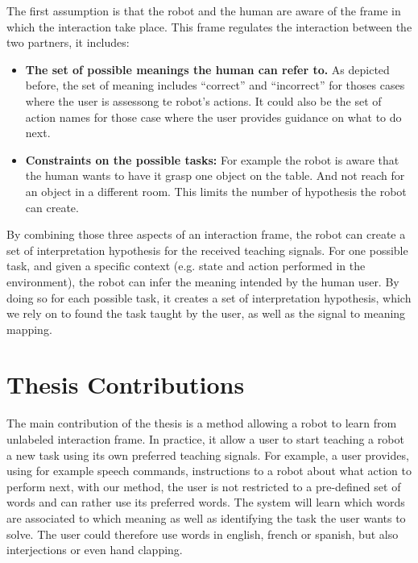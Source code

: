 The first assumption is that the robot and the human are aware of the frame in which the interaction take place. This frame regulates the interaction between the two partners, it includes:

\begin{itemize}

\item \textbf{The set of possible meanings the human can refer to.} As depicted before, the set of meaning includes ``correct'' and ``incorrect'' for thoses cases where the user is assessong te robot's actions. It could also be the set of action names for those case where the user provides guidance on what to do next.

\item \textbf{Constraints on the possible tasks:} For example the robot is aware that the human wants to have it grasp one object on the table. And not reach for an object in a different room. This limits the number of hypothesis the robot can create.

\end{itemize}

By combining those three aspects of an interaction frame, the robot can create a set of interpretation hypothesis for the received teaching signals. For one possible task, and given a specific context (e.g. state and action performed in the environment), the robot can infer the meaning intended by the human user. By doing so for each possible task, it creates a set of interpretation hypothesis, which we rely on to found the task taught by the user, as well as the signal to meaning mapping.

\section{Thesis Contributions}

The main contribution of the thesis is a method allowing a robot to learn from unlabeled interaction frame. In practice, it allow a user to start teaching a robot a new task using its own preferred teaching signals. For example, a user provides, using for example speech commands, instructions to a robot about what action to perform next, with our method, the user is not restricted to a pre-defined set of words and can rather use its preferred words. The system will learn which words are associated to which meaning as well as identifying the task the user wants to solve. The user could therefore use words in english, french or spanish, but also interjections or even hand clapping.

